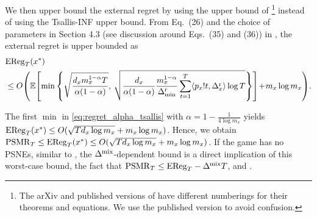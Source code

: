 We then upper bound the external regret by using the upper bound of \TsallisSPM{} \citep{ito2024adaptive}\footnote{The arXiv and published versions of \citet{ito2024adaptive} have different numberings for their theorems and equations. We use the published version to avoid confusion.} instead of using the Tsallis-INF upper bound.
From  Eq.~(26) and the choice of parameters in Section 4.3 (see discussion around Eqs.~(35) and (36)) in \citet{ito2024adaptive}, 
the external regret is upper bounded as
\begin{align}
    &
    \ER_T(x^*)
    \nonumber \\ 
    &\leq
    O\rbr{
    \EE\sbr{
        \min\left\{
        \sqrt{\frac{d_x m_x^{1-\alpha} T}{\alpha(1-\alpha)}}
        ,\,
        \sqrt{ 
            \frac{d_x}{\alpha(1-\alpha)} \frac{m_x^{1-\alpha}}{\DRmin} 
            \sum_{t=1}^T \langle p_x!t, \DeltaR_{x} \rangle
            \log T
        }
        \right\}
    }
    \!+\! m_x \log m_x
    }
    .
    \label{eq:regret_alpha_tsallis}
\end{align}
%

The first $\min$ in \eqref{eq:regret_alpha_tsallis} with $\alpha=1-\frac{1}{4\log m_x}$ yields
$\mathrm{EReg}_T(x^*) \leq O(\sqrt{T d_x \log m_x} + m_x \log m_x)$.
Hence, we obtain
$\mathrm{PSMR}_T \leq \mathrm{EReg}_T(x^*) \leq O(\sqrt{T d_x \log m_x} + m_x \log m_x)$.
If the game has no PSNEs, similar to , the $\Delta^{\mkern-1mu\mathrm{mix}}$-dependent bound is a direct implication of this worst-case bound, the fact that $\mathrm{PSMR}_T\leq \mathrm{EReg}_T-\Delta^{\mkern-1mu\mathrm{mix}} T$, and .

